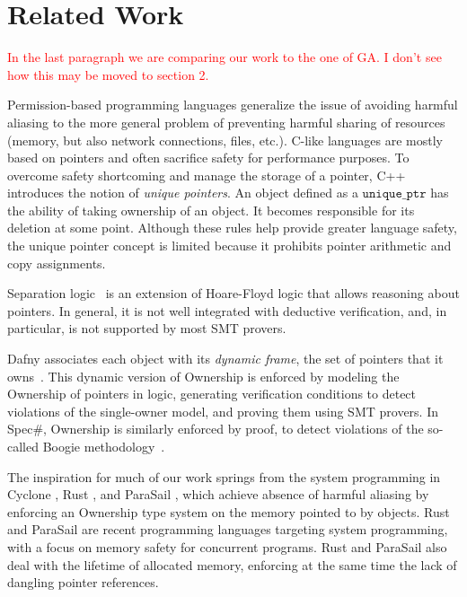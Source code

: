 \documentclass{llncs}
\newcommand\maroua[1]{\textcolor{red}{#1}}
\newcommand\var[1]{\ensuremath{\mathtt{#1}}}
\begin{document}
\section{Related Work}

\maroua{In the last paragraph we are comparing our work to the one of GA. I don't see how this may be moved to section 2.}

Permission-based programming languages generalize the issue of avoiding harmful aliasing to the more general problem of preventing harmful sharing of resources
(memory, but also network connections, files, etc.). C-like languages are mostly based on pointers and often sacrifice safety for performance purposes.
To overcome safety shortcoming and manage the storage of a pointer, C++ introduces the notion of \textit{unique pointers}. An object defined as a \var{unique\_ptr}
has the ability of taking ownership of an object. It becomes responsible for its deletion at some point. Although these rules help provide greater language safety, the unique
pointer concept is limited because it prohibits pointer arithmetic and copy assignments.

Separation logic~\cite{Reynolds02} is an extension of Hoare-Floyd logic that allows reasoning about pointers. In general, it is not well integrated with deductive
verification, and, in particular, is not supported by most SMT provers.


Dafny associates each object with its \emph{dynamic frame}, the set of pointers that it owns~\cite{Leino10}. This dynamic version of Ownership is
enforced by modeling the Ownership of pointers in logic, generating verification conditions to detect violations of the single-owner model, and proving
them using SMT provers. In Spec\#, Ownership is similarly enforced by proof, to detect violations of the so-called Boogie methodology~\cite{Boogie}.

The inspiration for much of our work springs from the system programming in Cyclone \cite{Grossman2002}, Rust \cite{Balasubramanian17}, and ParaSail \cite{Taft11}, which achieve absence of
harmful aliasing by enforcing an Ownership type system on the memory pointed to by objects. Rust and ParaSail are recent programming languages targeting system
programming, with a focus on memory safety for concurrent programs.
Rust and ParaSail also deal with the lifetime of allocated memory, enforcing
at the same time the lack of dangling pointer references.
\end{document}
